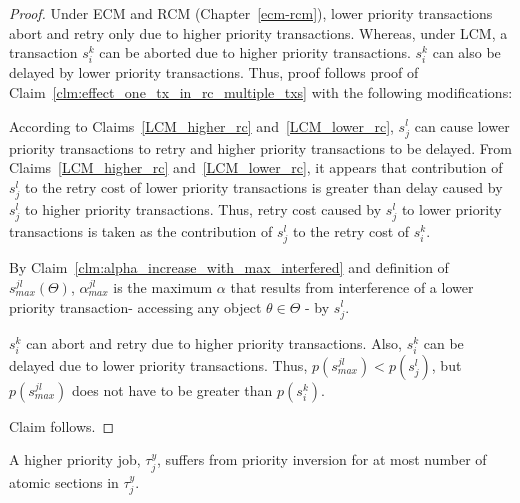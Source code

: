 \begin{proof}
Under ECM and RCM (Chapter~\ref{ecm-rcm}), lower priority transactions abort and retry only due to higher priority transactions. Whereas, under LCM, a transaction $s_i^k$ can be aborted due to higher priority transactions. $s_i^k$ can also be delayed by lower priority transactions. Thus, proof follows proof of Claim~\ref{clm:effect_one_tx_in_rc_multiple_txs} with the following modifications:
\begin{compactitem}
\item According to Claims~\ref{LCM_higher_rc} and~\ref{LCM_lower_rc}, $s_j^l$ can cause lower priority transactions to retry and higher priority transactions to be delayed. From Claims~\ref{LCM_higher_rc} and~\ref{LCM_lower_rc}, it appears that contribution of $s_j^l$ to the retry cost of lower priority transactions is greater than delay caused by $s_j^l$ to higher priority transactions. Thus, retry cost caused by $s_j^l$ to lower priority transactions is taken as the contribution of $s_j^l$ to the retry cost of $s_i^k$.
\item By Claim~\ref{clm:alpha_increase_with_max_interfered} and definition of $s_{max}^{jl}\left(\Theta\right)$, $\alpha_{max}^{jl}$ is the maximum $\alpha$ that results from interference of a lower priority transaction- accessing any object $\theta \in \Theta$ - by $s_j^l$.
\item $s_i^k$ can abort and retry due to higher priority transactions. Also, $s_i^k$ can be delayed due to lower priority transactions. Thus, $p\left(s_{max}^{jl}\right)<p\left(s_j^l\right)$, but $p\left(s_{max}^{jl}\right)$ does not have to be greater than $p\left(s_i^k\right)$.
\end{compactitem}
Claim follows.
%
\end{proof}
\begin{clm}
\label{no priority inversion in lcm}
%
A higher priority job, $\tau_j^y$, suffers from priority inversion for at most number of atomic sections in $\tau_j^y$.
\end{clm}
%

